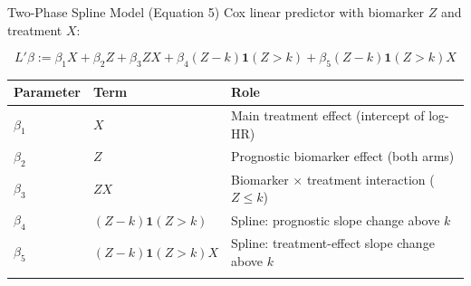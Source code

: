 \documentclass[
  ignorenonframetext,
  aspectratio=169]{beamer}
\begin{document}
\begin{frame}[shrink]{Two-Phase Spline Model (Equation 5)}
\label{two-phase-spline-model-equation-5}
Cox linear predictor with biomarker \(Z\) and treatment \(X\):

\[L'\beta := \beta_{1} X + \beta_{2} Z + \beta_{3} ZX + \beta_{4}(Z-k)\mathbf{1}(Z>k) + \beta_{5}(Z-k)\mathbf{1}(Z>k)X\]

\small

\begin{longtable}[]{@{}
  >{\centering\arraybackslash}p{}
  >{\raggedright\arraybackslash}p{}
  >{\raggedright\arraybackslash}p{}@{}}
\toprule\noalign{}
\begin{minipage}[b]{\linewidth}\centering
Parameter
\end{minipage} & \begin{minipage}[b]{\linewidth}\raggedright
Term
\end{minipage} & \begin{minipage}[b]{\linewidth}\raggedright
Role
\end{minipage} \\
\midrule\noalign{}
\endhead
\(\beta_{1}\) & \(X\) & Main treatment effect (intercept of log-HR) \\
\(\beta_{2}\) & \(Z\) & Prognostic biomarker effect (both arms) \\
\(\beta_{3}\) & \(ZX\) & Biomarker \(\times\) treatment interaction
(\(Z \leq k\)) \\
\(\beta_{4}\) & \((Z{-}k)\mathbf{1}(Z{>}k)\) & Spline: prognostic slope
change above \(k\) \\
\(\beta_{5}\) & \((Z{-}k)\mathbf{1}(Z{>}k)X\) & Spline: treatment-effect
slope change above \(k\) \\
\bottomrule\noalign{}
\end{longtable}

\normalsize
\end{frame}
\end{document}
